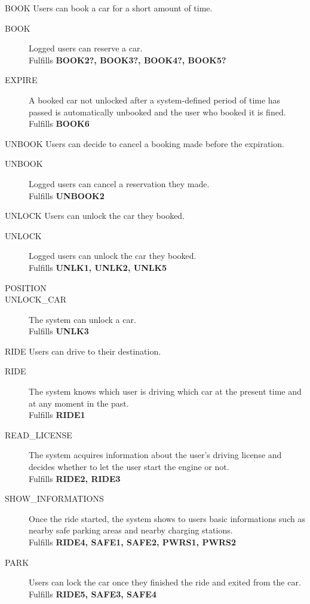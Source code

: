 \documentclass[11pt]{article} %
\begin{document}
	\item[BOOK] Users can book a car for a short amount of time.\hfill {\color{red}{double-check. Missing BOOK1. EXPIRE added}}
		\begin{description}
			\item[BOOK] Logged users can reserve a car. \\ Fulfills \textbf{BOOK2?, BOOK3?, BOOK4?, BOOK5? }
			\item[EXPIRE] A booked car not unlocked after a system-defined period of time has passed is automatically unbooked and the user who booked it is fined. \\ Fulfills \textbf{BOOK6}
		\end{description}

	\item[UNBOOK] Users can decide to cancel a booking made before the expiration.\hfill {\color{red}{Missing UNBOOK1}}
		\begin{description}
			\item[UNBOOK] Logged users can cancel a reservation they made. \\ Fulfills \textbf{UNBOOK2}
		\end{description}

	\item[UNLOCK] Users can unlock the car they booked. \hfill {\color{red}{Missing UNLK4}}
		\begin{description}
			\item[UNLOCK] Logged users can unlock the car they booked. \\ Fulfills \textbf{UNLK1, UNLK2, UNLK5}
			\item[POSITION] {\color{red}{ The system must be able to locate the user. }}
			\item[UNLOCK\_CAR] The system can unlock a car. \\ Fulfills \textbf{UNLK3}
		\end{description}

	\item[RIDE] Users can drive to their destination. \hfill  {\color{red}{change RIDE def. Add PARK}}
		\begin{description}
			\item[RIDE] The system knows which user is driving which car at the present time and at any moment in the past. \\ Fulfills \textbf{RIDE1}
			\item[READ\_LICENSE] The system acquires information about the user's driving license and decides whether to let the user start the engine or not. \\ Fulfills \textbf{RIDE2, RIDE3}
			\item[SHOW\_INFORMATIONS] Once the ride started, the system shows to users basic informations such as nearby safe parking areas and nearby charging stations. \\ Fulfills \textbf{RIDE4, SAFE1, SAFE2, PWRS1, PWRS2}
			\item[PARK] Users can lock the car once they finished the ride and exited from the car. \\ Fulfills \textbf{RIDE5, SAFE3, SAFE4}
		\end{description}
\end{document}
